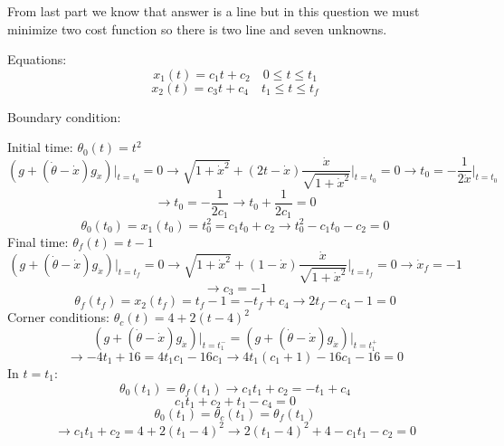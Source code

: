 From last part we know that answer is a line but in this question we must minimize two cost function so there is two line and seven unknowns.

Equations:
$$x_1(t) = c_1t +c_2 \quad 0\leq t \leq t_1$$
$$x_2(t) = c_3t +c_4 \quad t_1 \leq t \leq t_f$$


Boundary condition:



Initial time: 
$\theta_0(t) = t^2 $
$$(g + (\dot{\theta}-\dot{x})g_{\dot{x}}) \vert_{t = t_0}= 0 \to \sqrt{1+\dot{x}^2} + (2t -\dot{x} )\dfrac{\dot{x}}{\sqrt{1+\dot{x}^2}}\vert_{t = t_0} = 0 \to t_0 = -\dfrac{1}{2\dot{x}}\vert_{t = t_0}$$
$$\to t_0 = -\dfrac{1}{2c_1} \to t_0 + \dfrac{1}{2c_1} = 0$$
$$\theta_0(t_0) = x_1(t_0) = t_0^2 = c_1t_0 + c_2 \to t_0^2 - c_1t_0 - c_2 = 0 $$
Final time: 
$\theta_f(t) = t-1 $
$$(g + (\dot{\theta}-\dot{x})g_{\dot{x}})\vert_{t = t_f}  = 0 \to \sqrt{1+\dot{x}^2} + (1-\dot{x}) \dfrac{\dot{x}}{\sqrt{1+\dot{x}^2}}\vert_{t = t_f} = 0 \to \dot{x}_f = -1$$
$$\to c_3 = -1$$
$$\theta_f(t_f) = x_2(t_f) = t_f -1 = -t_f + c_4 \to 2t_f - c_4 -1 = 0 $$
Corner conditions:
$\theta_c(t) = 4 + 2(t-4)^2$
$$(g + (\dot{\theta}-\dot{x})g_{\dot{x}}) \vert_{t = t_1^-} = (g + (\dot{\theta}-\dot{x})g_{\dot{x}}) \vert_{t = t_1^+} $$
$$\to -4t_1 + 16 = 4t_1c_1 -16c_1 \to 4t_1(c_1+1) - 16c_1 -16 = 0$$
In $t = t_1$:
$$\theta_0(t_1) = \theta_f(t_1) \to c_1t_1+c_2 = -t_1 + c_4$$
$$c_1t_1+c_2  +t_1 - c_4 = 0$$
$$\theta_0(t_1) = \theta_c(t_1) = \theta_f(t_1)$$
$$\to c_1t_1 + c_2 = 4 + 2(t_1-4)^2 \to 2(t_1-4)^2 + 4 -c_1t_1 - c_2 = 0$$
